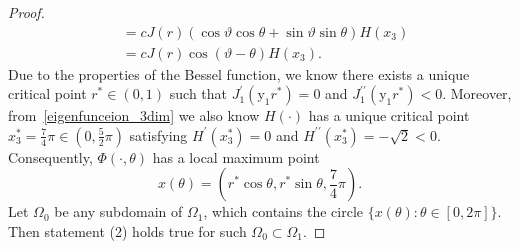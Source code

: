 \documentclass{elsarticle}
\begin{document}
\begin{proof}
\begin{equation*}
\begin{split}
&=cJ(r)\left( \cos\vartheta \cos\theta + \sin\vartheta\sin\theta \right) H(x_3)\\
&= cJ(r)\cos(\vartheta - \theta) H(x_3).
\end{split}
\end{equation*}
Due to the properties of the Bessel function, we know there exists a unique critical point $r^{\ast}\in(0, 1)$ such that $J_1^{\prime}(\mathrm{y}_{1}r^{\ast}) = 0$ and $J_1^{\prime\prime}(\mathrm{y}_{1}r^{\ast}) < 0$. Moreover, from~\eqref{eigenfunceion_3dim} we also know $H(\cdot)$ has a unique critical point $x^{\ast}_3 = \frac{7}{4}\pi \in(0, \frac{5}{2}\pi)$ satisfying $H^{\prime}(x^{\ast}_3) = 0$ and $H^{\prime\prime}(x^{\ast}_3)=-\sqrt{2} < 0$.
Consequently, $\Phi(\cdot, \theta)$ has a local maximum point
\[
	x(\theta) = (r^{\ast}\cos\theta, r^{\ast}\sin\theta,  \frac{7}{4}\pi).
\]
Let $\Omega_0$ be any subdomain of $\Omega_1$, which contains the circle $\{x(\theta): \theta\in[0, 2\pi] \}$. Then statement (2) holds true for such $\Omega_0\subset \Omega_1$.


\end{proof}
\end{document}
